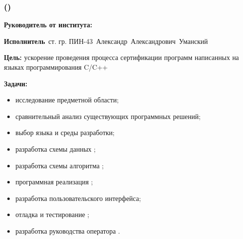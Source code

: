 \begin{frame}
    \frametitle{\textbf{\thesisTitle \textcolor{black}{({\ProgModule})}} }
\textbf{Руководитель от института:}~\supervisorRegaliaShort~\supervisorFioShort

\textbf{Исполнитель}~ст. гр. ПИН-43~Александр~Александрович~Уманский

\textbf{Цель:} ускорение проведения процесса сертификации программ написанных на языках программирования C/C++

\textbf{Задачи:}
\begin{itemize}
    \item исследование предметной области;
    \item сравнительный анализ существующих программных решений;
    \item выбор языка и среды разработки;
    \item разработка схемы данных {\ProgModule};
    \item разработка схемы алгоритма {\ProgModule};
    \item программная реализация {\ProgModule};
    \item разработка пользовательского интерфейса;
    \item отладка и тестирование {\ProgModule};
    \item разработка руководства оператора {\ProgModule}.
\end{itemize}
\end{frame}

